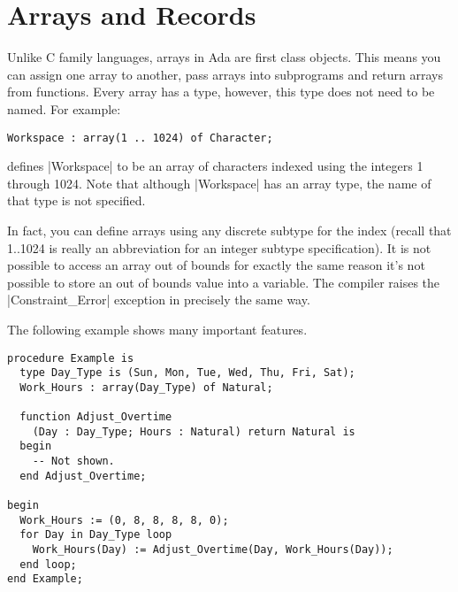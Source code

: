 \section{Arrays and Records}

Unlike C family languages, arrays in Ada are first class objects. This means you can assign one
array to another, pass arrays into subprograms and return arrays from functions. Every array has
a type, however, this type does not need to be named. For example:

\begin{lstlisting}
Workspace : array(1 .. 1024) of Character;
\end{lstlisting}

defines |Workspace| to be an array of characters indexed using the integers 1 through 1024. Note
that although |Workspace| has an array type, the name of that type is not specified.

In fact, you can define arrays using any discrete subtype for the index (recall that 1..1024 is
really an abbreviation for an integer subtype specification). It is not possible to access an
array out of bounds for exactly the same reason it's not possible to store an out of bounds
value into a variable. The compiler raises the |Constraint_Error| exception in precisely the
same way.

The following example shows many important features.

\begin{lstlisting}
procedure Example is
  type Day_Type is (Sun, Mon, Tue, Wed, Thu, Fri, Sat);
  Work_Hours : array(Day_Type) of Natural;

  function Adjust_Overtime
    (Day : Day_Type; Hours : Natural) return Natural is
  begin
    -- Not shown.
  end Adjust_Overtime;

begin
  Work_Hours := (0, 8, 8, 8, 8, 0);
  for Day in Day_Type loop
    Work_Hours(Day) := Adjust_Overtime(Day, Work_Hours(Day));
  end loop;
end Example;
\end{lstlisting}

